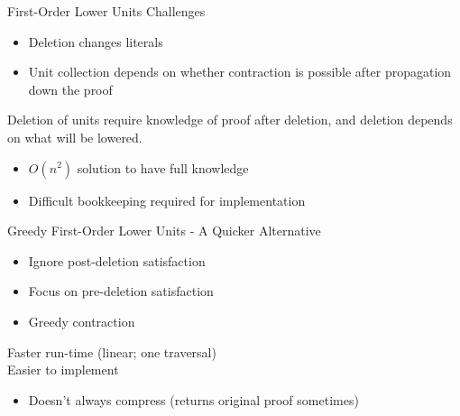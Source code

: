 \begin{frame}{First-Order Lower Units Challenges}

\begin{itemize}
\item Deletion changes literals
\item Unit collection depends on whether contraction is possible after propagation down the proof
\end{itemize}
\vspace{0.5cm}
Deletion of units require knowledge of proof after deletion, and deletion depends on what will be lowered.
\vspace{0.5cm}
\begin{itemize}
\item $O(n^2)$ solution to have full knowledge
\item Difficult bookkeeping required for implementation
\end{itemize}

\end{frame}

\begin{frame}{Greedy First-Order Lower Units - A Quicker Alternative}
\begin{itemize}
 \item Ignore post-deletion satisfaction 
 \item Focus on pre-deletion satisfaction 
 \item Greedy contraction
\end{itemize}
\vspace{0.5cm}
\pause
Faster run-time (linear; one traversal)\\
Easier to implement
\vspace{0.5cm}
\pause
\begin{itemize}
\item Doesn't always compress (returns original proof sometimes)
\end{itemize}
\end{frame}



